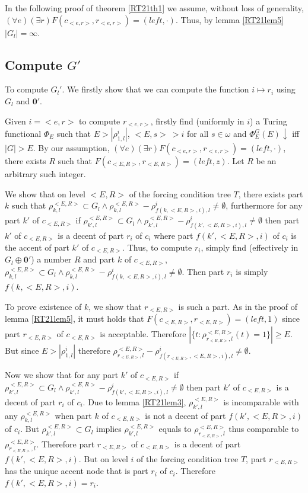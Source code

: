 \documentclass[options]{amsart}
\theoremstyle{definition}
\theoremstyle{remark}
\newtheorem{Ramsey's theorem}[theorem]{Ramsey's theorem}
\begin{document}
In the following proof of theorem
\ref{RT21th1} we assume,
without loss of generality,
 $(\forall e)(
\exists r) F(c_{<e,r>},r_{<e,r>})
= (left, \cdot)$. Thus, by lemma
\ref{RT21lem5} $|G_l|=\infty$.

\subsection{Compute $G'$}\label{RT21subsec3}

To compute $G_l'$. We firstly show that
we can compute the function
$i\mapsto r_i $ using
$G_l$ and $\mathbf{0}'$.

Given $i=<e,r>$ to compute $r_{<e,r>}$,
firstly find (uniformly in $i$)
 a Turing
functional $\Phi_E$ such that $E> |\rho^i_{1,l}|$,
 $<E,s> \ > i$ for all $s\in\omega$
and
$\Phi_E^G(E)\downarrow$ iff
$|G|>E$.
By our assumption, $(\forall e)(
\exists r) F(c_{<e,r>},r_{<e,r>})
= (left, \cdot)$, there exists
$R$ such that
$F(c_{<E,R>},r_{<E,R>})=(left,z)$.
Let $R$ be an arbitrary such
integer.

We show that on level $<E,R>$ of
the forcing condition tree $T$,
there exists part $k$ such that
$\rho^{<E,R>}_{k,l}\subset
G_l\wedge
\rho^{<E,R>}_{k,l}-
\rho^i_{f(k,<E,R>,i),l}\ne\emptyset$,
 furthermore for any
part $k'$ of $c_{<E,R>}$ if
 $\rho^{<E,R>}_{k',l}\subset
G_l\wedge
\rho^{<E,R>}_{k',l}-
\rho^i_{f(k',<E,R>, i),l}\ne\emptyset$
then part $k'$ of $c_{<E,R>}$
is a decent
of part $r_i$ of $c_i$
where part $f(k',<E,R>,i)$
of $c_i$ is the accent of part $k'$
of $c_{<E,R>}$.
Thus, to compute $r_i$, simply find
(effectively in $G_l\oplus \mathbf{0}'$)
a number $R$ and part $k$ of $c_{<E,R>}$,
$\rho^{<E,R>}_{k,l}\subset G_l\wedge
\rho^{<E,R>}_{k,l}-\rho^i_{f(k,<E,R>,i),l}\ne\emptyset$.
Then part $r_i$ is simply
$f(k,<E,R>, i)$.

To prove existence of $k$, we show that
$r_{<E,R>}$ is such a part.
As in the proof of lemma \ref{RT21lem5},
it must holds that
$F(c_{<E,R>},r_{<E,R>})=(left,1)$
since part
$r_{<E,R>}$ of
$c_{<E,R>}$ is acceptable.
Therefore $|\{t:
\rho^{<E,R>}_{r_{<E,R>},l}(t)=1\}|\geq E$.
But since $E> |\rho^i_{1,l}|$ therefore
$\rho^{<E,R>}_{r_{<E,R>},l}-\rho^i_{f(r_{<E,R>},
<E,R>,i),l}
\ne\emptyset$.

Now we show that for any
part $k'$ of $c_{<E,R>}$ if
 $\rho^{<E,R>}_{k',l}\subset
G_l\wedge
\rho^{<E,R>}_{k',l}-
\rho^i_{f(k',<E,R>, i),l}\ne\emptyset$
then part $k'$ of $c_{<E,R>}$
is a decent
of part $r_i$ of $c_i$.
Due to lemma
\ref{RT21lem3},
$\rho^{<E,R>}_{k',l}$ is incomparable
with any
$\rho^{<E,R>}_{k,l}$ when
part $k$ of $c_{<E,R>}$ is not a
decent
of part $f(k',<E,R>,i)$ of $c_i$.
But $\rho^{<E,R>}_{k',l}
\subset G_l$ implies
$\rho^{<E,R>}_{k',l}$ equals
to  $\rho^{<E,R>}_{r_{<E,R>},l}$
thus comparable to
$\rho^{<E,R>}_{r_{<E,R>},l}$.
Therefore part $r_{<E,R>}$
of $c_{<E,R>}$ is a decent
of part $f(k',<E,R>,i)$. But
on level $i$ of the forcing
condition tree $T$, part $r_{<E,R>}$
has the unique accent node that is
part $r_i$ of $c_i$.
Therefore $f(k',<E,R>,i)=r_i$.
\end{document}
